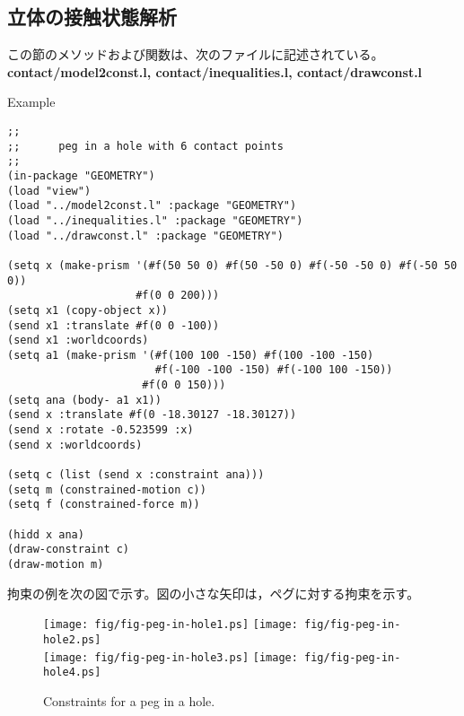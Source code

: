\subsection{\label{Contact}立体の接触状態解析}

この節のメソッドおよび関数は、次のファイルに記述されている。
{\bf contact/model2const.l, con\-tact/in\-e\-qual\-i\-ties.l, contact/drawconst.l}

\begin{refdesc}




\end{refdesc}
Example\\
\begin{verbatim}
;;
;;      peg in a hole with 6 contact points
;;
(in-package "GEOMETRY")
(load "view")
(load "../model2const.l" :package "GEOMETRY")
(load "../inequalities.l" :package "GEOMETRY")
(load "../drawconst.l" :package "GEOMETRY")

(setq x (make-prism '(#f(50 50 0) #f(50 -50 0) #f(-50 -50 0) #f(-50 50 0))
                    #f(0 0 200)))
(setq x1 (copy-object x))
(send x1 :translate #f(0 0 -100))
(send x1 :worldcoords)
(setq a1 (make-prism '(#f(100 100 -150) #f(100 -100 -150)
                       #f(-100 -100 -150) #f(-100 100 -150))
                     #f(0 0 150)))
(setq ana (body- a1 x1))
(send x :translate #f(0 -18.30127 -18.30127))
(send x :rotate -0.523599 :x)
(send x :worldcoords)

(setq c (list (send x :constraint ana)))
(setq m (constrained-motion c))
(setq f (constrained-force m))

(hidd x ana)
(draw-constraint c)
(draw-motion m)
\end{verbatim}
\clearpage
拘束の例を次の図で示す。図の小さな矢印は，ペグに対する拘束を示す。
\\
\begin{figure}[h]
\texttt{[image: fig/fig-peg-in-hole1.ps]}
\texttt{[image: fig/fig-peg-in-hole2.ps]}\\
\texttt{[image: fig/fig-peg-in-hole3.ps]}
\texttt{[image: fig/fig-peg-in-hole4.ps]}
\caption{Constraints for a peg in a hole.}
\label{fig:peg-in-hole}
\end{figure}
